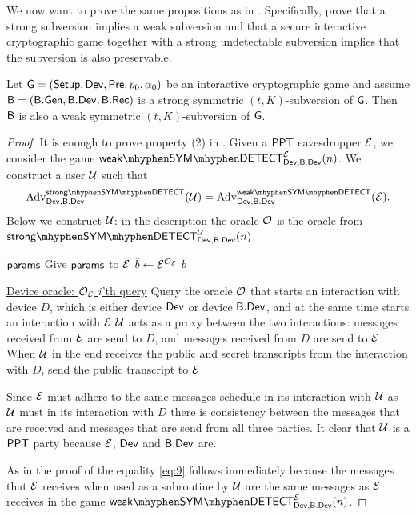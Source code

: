 We now want to prove the same propositions as in . Specifically, prove that a strong subversion implies a weak subversion and that a secure interactive cryptographic game together with a strong undetectable subversion implies that the subversion is also preservable. 

\begin{prop}
Let $\operatorname{\mathsf{G}}=\left(\operatorname{\mathsf{Setup}},\operatorname{\mathsf{Dev}},\operatorname{\mathsf{Pre}},p_{0},\alpha_{0}\right)$ be an interactive cryptographic game and assume $\mathsf{B} = \left(\mathsf{B}.\mathsf{Gen},\mathsf{B}.\mathsf{Dev},\mathsf{B}.\mathsf{Rec}\right)$ is a strong symmetric $(t,K)$-subversion of $\operatorname{\mathsf{G}}$. Then $\mathsf{B}$ is also a weak symmetric $(t,K)$-subversion of $\operatorname{\mathsf{G}}$. 
\end{prop}

\begin{proof}
It is enough to prove property (2) in . Given a $\mathsf{PPT}$ eavesdropper $\mathcal{E}$, we consider the game $\symweakdetect{\dev}{\bbdev}{\eve}$. We construct a user $\user$ such that
\begin{align}
\label{eq:9}
	\adv_{\dev,\bbdev}^{\symstrongdetectplain}(\user) = \adv_{\dev,\bbdev}^{\symweakdetectplain}(\eve).
\end{align} 
Below we construct $\user$: in the description the oracle $\operatorname{\mathcal{O}}$ is the oracle from $\symstrongdetect{\dev}{\bbdev}{\user}$.

\vspace*{-.3cm}
\begin{Algorithm}[]{7cm}
\captionUser
\caption{$\user$}
\label{alg:symWeakStrong}
\begin{algorithmic}[1]
\Require $\mathsf{params}$ 
\State Give $\mathsf{params}$ to $\mathcal{E}$
\State $\hat{b}\leftarrow\mathcal{E}^{\operatorname{\mathcal{O}}_{\mathcal{E}}}$
\State \Ret $\hat{b}$
\Statex\hrulefill
\end{algorithmic}
\begin{algorithmic}[1]
\Statex \underline{Device oracle: \textbf{$\operatorname{\mathcal{O}}_{\mathcal{E}}$} $i$'th query}
\Statex
\State Query the oracle $\operatorname{\mathcal{O}}$ that starts an interaction with device $D$, which is either device $\operatorname{\mathsf{Dev}}$ or device $\mathsf{B}.\mathsf{Dev}$, and at the same time starts an interaction with $\mathcal{E}$
\State $\user$ acts as a proxy between the two interactions: messages received from $\mathcal{E}$ are send to $D$, and messages received from $D$ are send to $\mathcal{E}$
\State When $\user$ in the end receives the public and secret transcripts from the interaction with $D$, send the public transcript to $\mathcal{E}$
\end{algorithmic}
\end{Algorithm}

Since $\mathcal{E}$ must adhere to the same messages schedule in its interaction with $\user$ as $\user$ must in its interaction with $D$ there is consistency between the messages that are received and messages that are send from all three parties. It clear that $\user$ is a $\mathsf{PPT}$ party because $\mathcal{E}$, $\operatorname{\mathsf{Dev}}$ and $\mathsf{B}.\mathsf{Dev}$ are. 

As in the proof of  the equality \ref{eq:9} follows immediately because the messages that $\mathcal{E}$ receives when used as a subroutine by $\user$ are the same messages as $\mathcal{E}$ receives in the game $\symweakdetect{\dev}{\bbdev}{\eve}$.
\end{proof}

